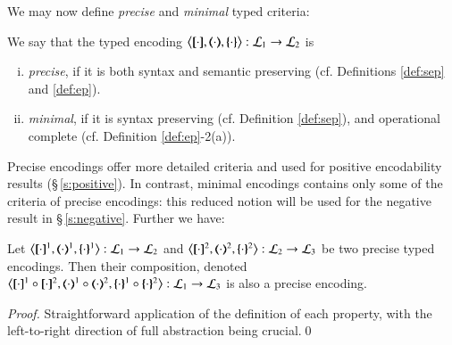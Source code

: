 We may now define \emph{precise} and \emph{minimal} typed criteria: 

\begin{definition}\rm\label{def:goodenc}
We say that 
	the typed encoding 
	$\enco{\map{\cdot}, \mapt{\cdot}, \mapa{\cdot}}: \tyl{L}_1 \to \tyl{L}_2$ is 
	\begin{enumerate}[(i)]
	\item \emph{precise}, if it is both syntax and semantic preserving (cf. Definitions \ref{def:sep} and  \ref{def:ep}).
	\item \emph{minimal}, if it is syntax preserving 
	(cf. Definition \ref{def:sep}),
	and operational complete (cf. Definition \ref{def:ep}-2(a)).
	\end{enumerate}
\end{definition}

Precise encodings offer more detailed criteria and used for positive 
encodability results (\S\,\ref{s:positive}).
In contrast, minimal encodings contains only 
some of the criteria of precise encodings:    
this reduced notion will be used 
for the negative result in \S\,\ref{s:negative}. Further we have:
	



\begin{proposition}\rm
	Let %
	$\enco{\map{\cdot}^{1}, \mapt{\cdot}^{1}, \mapa{\cdot}^{1}}: \tyl{L}_1 \to \tyl{L}_2$
	and 
	$\enco{\map{\cdot}^{2}, \mapt{\cdot}^{2}, \mapa{\cdot}^{2}}: \tyl{L}_2 \to \tyl{L}_3$
	be two precise typed encodings.
	Then their composition, denoted 
	$\enco{\map{\cdot}^{1} \circ \map{\cdot}^{2}, \mapt{\cdot}^{1} \circ \mapt{\cdot}^{2}, \mapa{\cdot}^{1}\circ \mapa{\cdot}^{2}}: \tyl{L}_1 \to \tyl{L}_3$
	is also a precise encoding.
\end{proposition}

\begin{proof}
	Straightforward application of the definition of each property, with the left-to-right direction of
	full abstraction being crucial.\qed
\end{proof}


